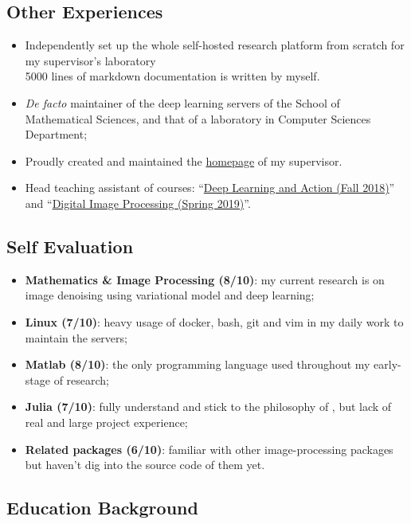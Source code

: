 \subsection*{Other Experiences}
  \begin{itemize}
      \item Independently set up the whole self-hosted research platform from scratch for my supervisor's laboratory\\
        {\small
        5000 lines of markdown documentation is written by myself.
        }
      \item \textit{De facto} maintainer of the deep learning servers of the School of Mathematical Sciences, and that of a laboratory in Computer Sciences Department;
      \item Proudly created and maintained the \href{http://math.ecnu.edu.cn/~fli/}{homepage} of my supervisor.
      \item Head teaching assistant of courses: ``\href{http://math.ecnu.edu.cn/~fli/Teaching/DeepLearning/Fall2018/index.html}{Deep Learning and Action (Fall 2018)}''  and ``\href{http://math.ecnu.edu.cn/~fli/Teaching/DigitalImageProcessing/Spring2019/index.html}{Digital Image Processing (Spring 2019)}''.
  \end{itemize}


\subsection*{Self Evaluation}
\begin{itemize}
    \item \textbf{Mathematics \& Image Processing (8/10)}: my current research is on image denoising using variational model and deep learning;
    \item \textbf{Linux (7/10)}: heavy usage of docker, bash, git and vim in my daily work to maintain the servers;
    \item \textbf{Matlab (8/10)}: the only programming language used throughout my early-stage of research;
    \item \textbf{Julia (7/10)}: fully understand and stick to the philosophy of \langjulia, but lack of real and large project experience;
    \item \textbf{Related packages (6/10)}: familiar with other image-processing packages but haven't dig into the source code of them yet.
\end{itemize}

\subsection*{Education Background}

